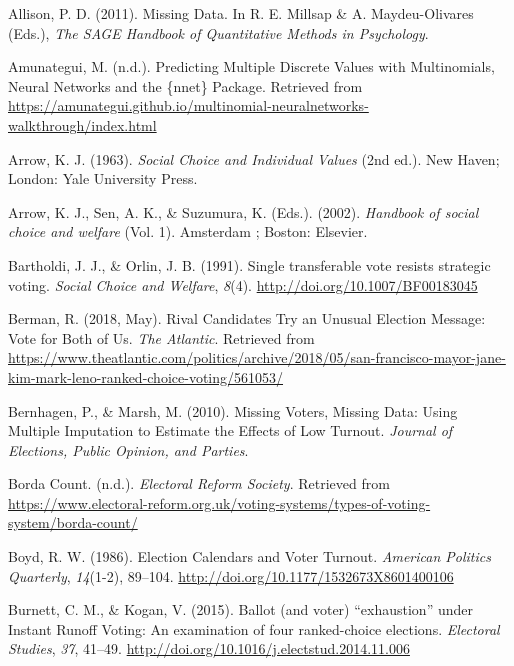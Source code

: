 \documentclass[12pt,twoside]{reedthesis}
\begin{document}
\leavevmode\hypertarget{ref-allison_missing_2011}{}%
Allison, P. D. (2011). Missing Data. In R. E. Millsap \& A. Maydeu-Olivares (Eds.), \emph{The SAGE Handbook of Quantitative Methods in Psychology}.

\leavevmode\hypertarget{ref-amunategui_predicting_nodate}{}%
Amunategui, M. (n.d.). Predicting Multiple Discrete Values with Multinomials, Neural Networks and the \{nnet\} Package. Retrieved from \url{https://amunategui.github.io/multinomial-neuralnetworks-walkthrough/index.html}

\leavevmode\hypertarget{ref-arrow_social_1963}{}%
Arrow, K. J. (1963). \emph{Social Choice and Individual Values} (2nd ed.). New Haven; London: Yale University Press.

\leavevmode\hypertarget{ref-arrow_handbook_2002}{}%
Arrow, K. J., Sen, A. K., \& Suzumura, K. (Eds.). (2002). \emph{Handbook of social choice and welfare} (Vol. 1). Amsterdam ; Boston: Elsevier.

\leavevmode\hypertarget{ref-bartholdi_single_1991}{}%
Bartholdi, J. J., \& Orlin, J. B. (1991). Single transferable vote resists strategic voting. \emph{Social Choice and Welfare}, \emph{8}(4). \url{http://doi.org/10.1007/BF00183045}

\leavevmode\hypertarget{ref-berman_rival_2018}{}%
Berman, R. (2018, May). Rival Candidates Try an Unusual Election Message: Vote for Both of Us. \emph{The Atlantic}. Retrieved from \url{https://www.theatlantic.com/politics/archive/2018/05/san-francisco-mayor-jane-kim-mark-leno-ranked-choice-voting/561053/}

\leavevmode\hypertarget{ref-bernhagen_missing_2010}{}%
Bernhagen, P., \& Marsh, M. (2010). Missing Voters, Missing Data: Using Multiple Imputation to Estimate the Effects of Low Turnout. \emph{Journal of Elections, Public Opinion, and Parties}.

\leavevmode\hypertarget{ref-noauthor_borda_nodate}{}%
Borda Count. (n.d.). \emph{Electoral Reform Society}. Retrieved from \url{https://www.electoral-reform.org.uk/voting-systems/types-of-voting-system/borda-count/}

\leavevmode\hypertarget{ref-boyd_election_1986}{}%
Boyd, R. W. (1986). Election Calendars and Voter Turnout. \emph{American Politics Quarterly}, \emph{14}(1-2), 89--104. \url{http://doi.org/10.1177/1532673X8601400106}

\leavevmode\hypertarget{ref-burnett_ballot_2015}{}%
Burnett, C. M., \& Kogan, V. (2015). Ballot (and voter) ``exhaustion'' under Instant Runoff Voting: An examination of four ranked-choice elections. \emph{Electoral Studies}, \emph{37}, 41--49. \url{http://doi.org/10.1016/j.electstud.2014.11.006}
\end{document}
